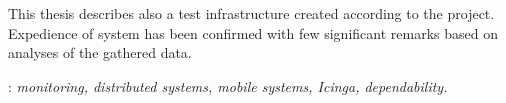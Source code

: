 \begin{titlepage}
{      \indent This thesis describes also a test infrastructure
      created according to the project. Expedience of system has been
      confirmed with few significant remarks based on analyses of the
      gathered data.  } \vspace*{1\baselineskip}

    : {\itshape monitoring, distributed
      systems, mobile systems, Icinga, dependability.}

\end{titlepage}

